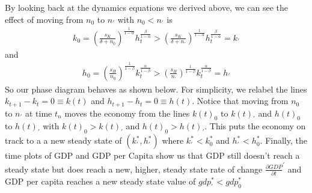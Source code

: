 \documentclass[11pt]{SelfArxOneColBMN}
\begin{document}
\begin{enumerate}
\begin{enumerate}
    \begin{solution}
      By looking back at the dynamics equations we derived above, we can see the effect of moving from $n_0$ to $n_\prime$ with $n_0 < n_\prime$ is
      \begin{eqnarray*}
        k_0 = (\frac{s_K}{\delta + n_0})^\frac{1}{1 - \alpha}h_t^\frac{\beta}{1 - \alpha} > (\frac{s_K}{\delta + n_\prime})^\frac{1}{1 - \alpha}h_t^\frac{\beta}{1 - \alpha} = k_\prime
      \end{eqnarray*}
      and
      \begin{eqnarray*}
        h_0 = (\frac{s_H}{n_0})^\frac{1}{1 - \beta}k_t^\frac{\alpha}{1 - \beta} > (\frac{s_H}{n_\prime})^\frac{1}{1 - \beta}k_t^\frac{\alpha}{1 - \beta} = h_\prime
      \end{eqnarray*}
      So our phase diagram behaves as shown below. For simplicity, we relabel the lines $k_{t+1} - k_t = 0 \equiv k(t)$ and $h_{t+1} - h_t = 0 \equiv h(t)$. Notice that moving from $n_0$ to $n_\prime$ at time $t_n$ moves the economy from the lines $k(t)_0$ to $k(t)_\prime$ and $h(t)_0$ to $h(t)_\prime$ with $k(t)_0 > k(t)_\prime$ and $h(t)_0 > h(t)_\prime$. This puts the economy on track to a a new steady state of $(k_\prime^*,h_\prime^*)$ where $k_\prime^* < k_0^*$ and $h_\prime^* < h_0^*$. Finally, the time plots of GDP and GDP per Capita show us that GDP still doesn't reach a steady state but does reach a new, higher, steady state rate of change $\frac{\partial GDP}{\partial t}^\prime$ and GDP per capita reaches a new steady state value of $gdp_\prime^* < gdp_0^*$\\

\end{solution}
\end{enumerate}
\end{enumerate}
\end{document}
